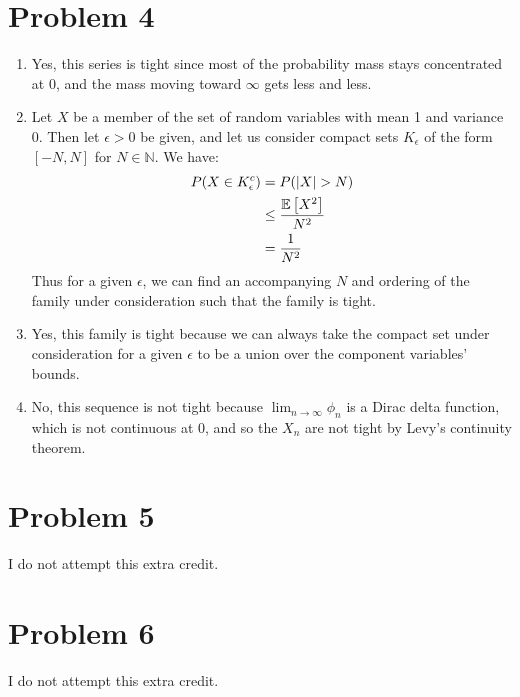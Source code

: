 \documentclass{article}
\begin{document}
\section*{Problem 4}
\begin{enumerate}[label=(\alph*)]
\item Yes, this series is tight since most of the probability mass stays concentrated at 0, and the mass moving toward $\infty$ gets less and less.
\item Let $X$ be a member of the set of random variables with mean 1 and variance 0. Then let $\epsilon > 0$ be given, and let us consider compact sets $K_\epsilon$ of the form $[-N,N]$ for $N \in \mathbb{N}$. We have:
\begin{align*}
    P(X \in K_\epsilon^c) &= P(|X| > N) \\
    &\leq \frac{\mathbb{E}\left[X^2\right]}{N^2} \\
    &= \frac{1}{N^2}
\end{align*}
Thus for a given $\epsilon$, we can find an accompanying $N$ and ordering of the family under consideration such that the family is tight. 
\item Yes, this family is tight because we can always take the compact set under consideration for a given $\epsilon$ to be a union over the component variables' bounds. 
\item No, this sequence is not tight because $\lim_{n\to\infty}\phi_n$ is a Dirac delta function, which is not continuous at 0, and so the $X_n$ are not tight by Levy's continuity theorem.
\end{enumerate}

\section*{Problem 5}
I do not attempt this extra credit.

\section*{Problem 6}
I do not attempt this extra credit.
\end{document}
